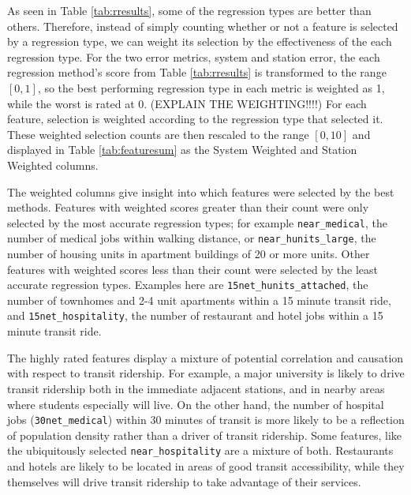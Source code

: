 \documentclass[11pt]{article}
\begin{document}
As seen in Table \ref{tab:rresults}, some of the regression types are better than others. Therefore, instead of simply counting whether or not a feature is selected by a regression type, we can weight its selection by the effectiveness of the each regression type. For the two error metrics, system and station error, the each regression method's score from Table \ref{tab:rresults} is transformed to the range $[0, 1]$, so the best performing regression type in each metric is weighted as 1, while the worst is rated at 0. (EXPLAIN THE WEIGHTING!!!!) For each feature, selection is weighted according to the regression type that selected it. These weighted selection counts are then rescaled to the range $[0, 10]$ and displayed in Table \ref{tab:featuresum} as the System Weighted and Station Weighted columns.

The weighted columns give insight into which features were selected by the best methods. Features with weighted scores greater than their count were only selected by the most accurate regression types; for example \texttt{near\_medical}, the number of medical jobs within walking distance, or \texttt{near\_hunits\_large}, the number of housing units in apartment buildings of 20 or more units. Other features with weighted scores less than their count were selected by the least accurate regression types. Examples here are \texttt{15net\_hunits\_attached}, the number of townhomes and 2-4 unit apartments within a 15 minute transit ride, and \texttt{15net\_hospitality}, the number of restaurant and hotel jobs within a 15 minute transit ride. 

The highly rated features display a mixture of potential correlation and causation with respect to transit ridership. For example, a major university is likely to drive transit ridership both in the immediate adjacent stations, and in nearby areas where students especially will live. On the other hand, the number of hospital jobs (\texttt{30net\_medical}) within 30 minutes of transit is more likely to be a reflection of population density rather than a driver of transit ridership. Some features, like the ubiquitously selected \texttt{near\_hospitality} are a mixture of both. Restaurants and hotels are likely to be located in areas of good transit accessibility, while they themselves will drive transit ridership to take advantage of their services. 
\end{document}
